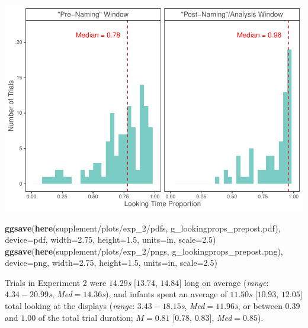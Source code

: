 \documentclass[
  doc,floatsintext]{apa6}
\newenvironment{Shaded}{\begin{snugshade}}{\end{snugshade}}
\newcommand{\AttributeTok}[1]{\textcolor[rgb]{0.13,0.29,0.53}{#1}}
\newcommand{\FloatTok}[1]{\textcolor[rgb]{0.00,0.00,0.81}{#1}}
\newcommand{\FunctionTok}[1]{\textcolor[rgb]{0.13,0.29,0.53}{\textbf{#1}}}
\newcommand{\NormalTok}[1]{#1}
\newcommand{\StringTok}[1]{\textcolor[rgb]{0.31,0.60,0.02}{#1}}
\begin{document}
\includegraphics{revised_ms_analyses_files/figure-latex/r2-g-durs-prepost-lookingprops-1.pdf}

\begin{Shaded}
\begin{Highlighting}[]
\FunctionTok{ggsave}\NormalTok{(}\FunctionTok{here}\NormalTok{(}\StringTok{\textquotesingle{}supplement/plots/exp\_2/pdfs\textquotesingle{}}\NormalTok{, }\StringTok{\textquotesingle{}g\_lookingprops\_prepost.pdf\textquotesingle{}}\NormalTok{), }
       \AttributeTok{device=}\StringTok{\textquotesingle{}pdf\textquotesingle{}}\NormalTok{, }\AttributeTok{width=}\FloatTok{2.75}\NormalTok{, }\AttributeTok{height=}\FloatTok{1.5}\NormalTok{, }\AttributeTok{units=}\StringTok{\textquotesingle{}in\textquotesingle{}}\NormalTok{, }\AttributeTok{scale=}\FloatTok{2.5}\NormalTok{)}
\FunctionTok{ggsave}\NormalTok{(}\FunctionTok{here}\NormalTok{(}\StringTok{\textquotesingle{}supplement/plots/exp\_2/pngs\textquotesingle{}}\NormalTok{, }\StringTok{\textquotesingle{}g\_lookingprops\_prepost.png\textquotesingle{}}\NormalTok{), }
       \AttributeTok{device=}\StringTok{\textquotesingle{}png\textquotesingle{}}\NormalTok{, }\AttributeTok{width=}\FloatTok{2.75}\NormalTok{, }\AttributeTok{height=}\FloatTok{1.5}\NormalTok{, }\AttributeTok{units=}\StringTok{\textquotesingle{}in\textquotesingle{}}\NormalTok{, }\AttributeTok{scale=}\FloatTok{2.5}\NormalTok{)}
\end{Highlighting}
\end{Shaded}

Trials in Experiment 2 were \(14.29\)\textit{s} {[}\(13.74\), \(14.84\){]} long on average (\textit{range}: \(4.34-20.99\)\textit{s}, \textit{Med}\(=14.36\)\textit{s}), and infants spent an average of \(11.50\)\textit{s} {[}\(10.93\), \(12.05\){]} total looking at the displays (\textit{range}: \(3.43-18.15\)\textit{s}, \textit{Med}\(=11.96\)\textit{s}, or between \(0.39\) and \(1.00\) of the total trial duration; \(M=0.81\) {[}\(0.78\), \(0.83\){]}, \textit{Med}\(=0.85\)).
\end{document}
